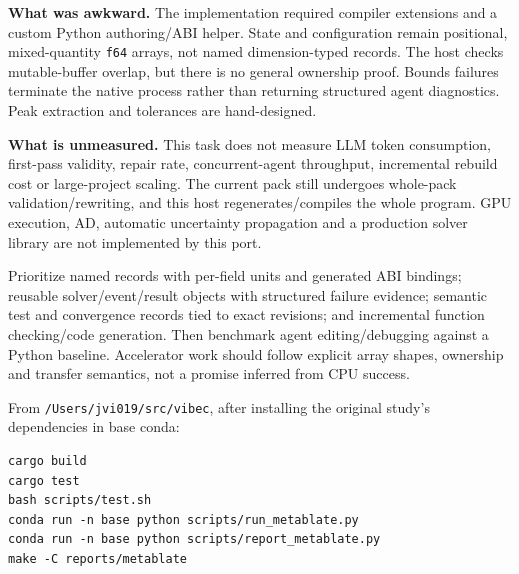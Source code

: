 \documentclass[10pt]{article}
\begin{document}
\textbf{What was awkward.} The implementation required compiler extensions and
a custom Python authoring/ABI helper. State and configuration remain positional,
mixed-quantity \texttt{f64} arrays, not named dimension-typed records. The host
checks mutable-buffer overlap, but there is no general ownership proof.
Bounds failures terminate the native process rather than returning structured
agent diagnostics. Peak extraction and tolerances are hand-designed.

\textbf{What is unmeasured.} This task does not measure LLM token consumption,
first-pass validity, repair rate, concurrent-agent throughput, incremental rebuild
cost or large-project scaling. The current pack still undergoes whole-pack
validation/rewriting, and this host regenerates/compiles the whole program.
GPU execution, AD, automatic uncertainty propagation and a production solver
library are not implemented by this port.


Prioritize named records with per-field units and generated ABI bindings;
reusable solver/event/result objects with structured failure evidence; semantic
test and convergence records tied to exact revisions; and incremental function
checking/code generation. Then benchmark agent editing/debugging against a
Python baseline. Accelerator work should follow explicit array shapes,
ownership and transfer semantics, not a promise inferred from CPU success.


From \texttt{/Users/jvi019/src/vibec}, after installing the original study's
dependencies in base conda:
\begin{lstlisting}
cargo build
cargo test
bash scripts/test.sh
conda run -n base python scripts/run_metablate.py
conda run -n base python scripts/report_metablate.py
make -C reports/metablate
\end{lstlisting}

\newpage
{}
\end{document}
